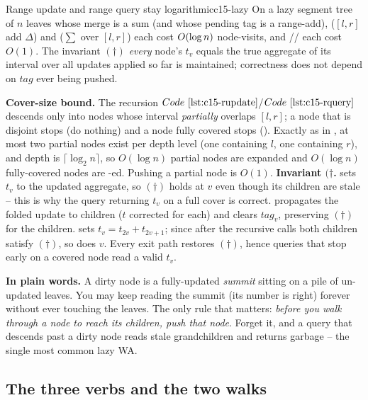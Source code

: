 \begin{theorem}{Range update and range query stay logarithmic}{c15-lazy}
On a lazy segment tree of \(n\) leaves whose merge is a sum (and whose pending tag is a range-add),  (\([l,r]\) add \(\Delta\)) and  (\(\sum\) over \([l,r]\)) each cost \(O(\log n)\) node-visits, and // each cost \(O(1)\).  The invariant \((\dag)\) \emph{every} node's \(t_v\) equals the true aggregate of its interval over all updates applied so far is maintained; correctness does not depend on \(\mathit{tag}\) ever being pushed.
\end{theorem}
\begin{proofbox}
\textbf{Cover-size bound.} The recursion \(\coderef{c15-rupdate}\)/\(\coderef{c15-rquery}\) descends only into nodes whose interval \emph{partially} overlaps \([l,r]\); a node that is disjoint stops (do nothing) and a node fully covered stops ().  Exactly as in , at most two partial nodes exist per depth level (one containing \(l\), one containing \(r\)), and depth is \(\lceil\log_2 n\rceil\), so \(O(\log n)\) partial nodes are expanded and \(O(\log n)\) fully-covered nodes are -ed.  Pushing a partial node is \(O(1)\).
\textbf{Invariant \((\dag\).}  sets \(t_v\) to the updated aggregate, so \((\dag)\) holds at \(v\) even though its children are stale -- this is why the query returning \(t_v\) on a full cover is correct.   propagates the folded update to children (\(t\) corrected for each) and clears \(\mathit{tag}_v\), preserving \((\dag)\) for the children.   sets \(t_v=t_{2v}+t_{2v+1}\); since after the recursive calls both children satisfy \((\dag)\), so does \(v\).  Every exit path restores \((\dag)\), hence queries that stop early on a covered node read a valid \(t_v\).
\end{proofbox}

\noindent\textbf{In plain words.}  A dirty node is a fully-updated \emph{summit} sitting on a pile of un-updated leaves.  You may keep reading the summit (its number is right) forever without ever touching the leaves.  The only rule that matters: \emph{before you walk \emph{through} a node to reach its children, push that node}.  Forget it, and a query that descends past a dirty node reads stale grandchildren and returns garbage -- the single most common lazy WA.

\subsection{The three verbs and the two walks}

